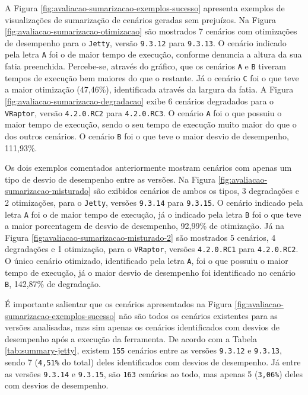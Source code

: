 A Figura \ref{fig:avaliacao-sumarizacao-exemplos-sucesso} apresenta exemplos de visualizações de sumarização de cenários geradas sem prejuízos. Na Figura \ref{fig:avaliacao-sumarizacao-otimizacao} são mostrados 7 cenários com otimizações de desempenho para o \texttt{Jetty}, versão \texttt{9.3.12} para \texttt{9.3.13}. O cenário indicado pela letra \texttt{A} foi o de maior tempo de execução, conforme denuncia a altura da sua fatia preenchida. Percebe-se, através do gráfico, que os cenários \texttt{A} e \texttt{B} tiveram tempos de execução bem maiores do que o restante. Já o cenário \texttt{C} foi o que teve a maior otimização (47,46\%), identificada através da largura da fatia. A Figura \ref{fig:avaliacao-sumarizacao-degradacao} exibe 6 cenários degradados para o \texttt{VRaptor}, versão \texttt{4.2.0.RC2} para \texttt{4.2.0.RC3}. O cenário \texttt{A} foi o que possuiu o maior tempo de execução, sendo o seu tempo de execução muito maior do que o dos outros cenários. O cenário \texttt{B} foi o que teve o maior desvio de desempenho, 111,93\%.

Os dois exemplos comentados anteriormente mostram cenários com apenas um tipo de desvio de desempenho entre as versões. Na Figura \ref{fig:avaliacao-sumarizacao-misturado} são exibidos cenários de ambos os tipos, 3 degradações e 2 otimizações, para o \texttt{Jetty}, versões \texttt{9.3.14} para \texttt{9.3.15}. O cenário indicado pela letra \texttt{A} foi o de maior tempo de execução, já o indicado pela letra \texttt{B} foi o que teve a maior porcentagem de desvio de desempenho, 92,99\% de otimização. Já na Figura \ref{fig:avaliacao-sumarizacao-misturado-2} são mostrados 5 cenários, 4 degradações e 1 otimização, para o \texttt{VRaptor}, versões \texttt{4.2.0.RC1} para \texttt{4.2.0.RC2}. O único cenário otimizado, identificado pela letra \texttt{A}, foi o que possuiu o maior tempo de execução, já o maior desvio de desempenho foi identificado no cenário \texttt{B}, 142,87\% de degradação.

É importante salientar que os cenários apresentados na Figura \ref{fig:avaliacao-sumarizacao-exemplos-sucesso} não são todos os cenários existentes para as versões analisadas, mas sim apenas os cenários identificados com desvios de desempenho após a execução da ferramenta. De acordo com a Tabela \ref{tab:summary-jetty}, existem \texttt{155} cenários entre as versões \texttt{9.3.12} e \texttt{9.3.13}, sendo 7 (\texttt{4,51\%} do total) deles identificados com desvios de desempenho. Já entre as versões \texttt{9.3.14} e \texttt{9.3.15}, são \texttt{163} cenários ao todo, mas apenas 5 (\texttt{3,06\%}) deles com desvios de desempenho.

